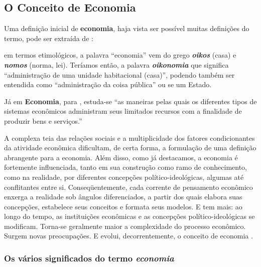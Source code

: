 \documentclass[
	10pt,				%
	openright,			%
	twoside,			%
	a5paper,			%
	english,			%
	french,				%
	spanish,			%
	brazil				%
	]{abntex2}
\renewenvironment{quote}
  {\small\list{}{\rightmargin=0.1cm \leftmargin=4cm}%
   \item\relax}
  {\endlist}
\begin{document}
\subsection{O Conceito de Economia}\label{o-conceito-de-economia}

Uma definição inicial de \textbf{economia}, haja vista ser possível
muitas definições do termo, pode ser extraída de
:

\begin{quote}
em termos etimológicos, a palavra ``economia'' vem do grego
\textbf{\emph{oikos}} (casa) e \textbf{\emph{nomos}} (norma, lei).
Teríamos então, a palavra \textbf{\emph{oikonomia}} que significa
``administração de uma unidade habitacional (casa)'', podendo também ser
entendida como ``administração da coisa pública'' ou se um Estado.
\end{quote}

Já em \textbf{Economia}, para , estuda-se
``as maneiras pelas quais os diferentes tipos de sistemas econômicos
administram seus limitados recursos com a finalidade de produzir bens e
serviços.''

\begin{quote}
A complexa teia das relações sociais e a multiplicidade dos fatores
condicionantes da atividade econômica dificultam, de certa forma, a
formulação de uma definição abrangente para a economia. Além disso, como
já destacamos, a economia é fortemente influenciada, tanto em sua
construção como ramo de conhecimento, como na realidade, por diferentes
concepções político-ideológicas, algumas até conflitantes entre si.
Conseqüentemente, cada corrente de pensamento econômico enxerga a
realidade sob ângulos diferenciados, a partir dos quais elabora suas
concepções, estabelece seus conceitos e formata seus modelos. E tem
mais: ao longo do tempo, as instituições econômicas e as concepções
político-ideológicas se modificam. Torna-se geralmente maior a
complexidade do processo econômico. Surgem novas preocupações. E evolui,
decorrentemente, o conceito de economia \cite[p.~43-46]{rossetti}.
\end{quote}

\subsubsection{\texorpdfstring{Os vários significados do termo
\emph{economia}}{Os vários significados do termo economia}}\label{os-vuxe1rios-significados-do-termo-economia}
\end{document}
